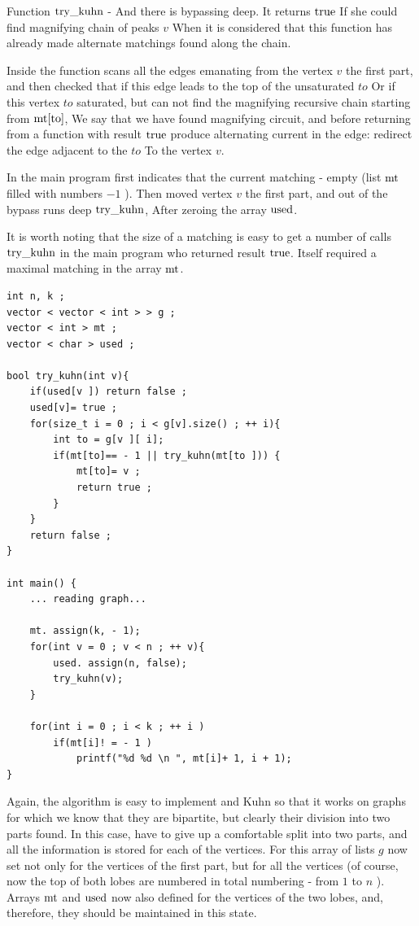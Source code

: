 Function $\rm try \_kuhn$ - And there is bypassing deep. It returns $\rm true$ If she could find magnifying chain of peaks $v$ When it is considered that this function has already made alternate matchings found along the chain.

Inside the function scans all the edges emanating from the vertex $v$ the first part, and then checked that if this edge leads to the top of the unsaturated $to$ Or if this vertex $to$ saturated, but can not find the magnifying recursive chain starting from $\rm mt [to]$, We say that we have found magnifying circuit, and before returning from a function with result $\rm true$ produce alternating current in the edge: redirect the edge adjacent to the $to$ To the vertex $v$.

In the main program first indicates that the current matching - empty (list $\rm mt$ filled with numbers $-1$ ). Then moved vertex $v$ the first part, and out of the bypass runs deep $\rm try \_kuhn$, After zeroing the array $\rm used$.

It is worth noting that the size of a matching is easy to get a number of calls $\rm try \_kuhn$ in the main program who returned result $\rm true$. Itself required a maximal matching in the array $\rm mt$.

\begin{verbatim}
int n, k ;
vector < vector < int > > g ;
vector < int > mt ;
vector < char > used ;
 
bool try_kuhn(int v){
    if(used[v ]) return false ;
    used[v]= true ;
    for(size_t i = 0 ; i < g[v].size() ; ++ i){
        int to = g[v ][ i];
        if(mt[to]== - 1 || try_kuhn(mt[to ])) {
            mt[to]= v ;
            return true ;
        }
    }
    return false ;
}
 
int main() {
    ... reading graph...
 
    mt. assign(k, - 1);
    for(int v = 0 ; v < n ; ++ v){
        used. assign(n, false);
        try_kuhn(v);
    }
 
    for(int i = 0 ; i < k ; ++ i )
        if(mt[i]! = - 1 )
            printf("%d %d \n ", mt[i]+ 1, i + 1);
} 
\end{verbatim}
Again, the algorithm is easy to implement and Kuhn so that it works on graphs for which we know that they are bipartite, but clearly their division into two parts found. In this case, have to give up a comfortable split into two parts, and all the information is stored for each of the vertices. For this array of lists $g$ now set not only for the vertices of the first part, but for all the vertices (of course, now the top of both lobes are numbered in total numbering - from $1$ to $n$ ). Arrays $\rm mt$ and $\rm used$ now also defined for the vertices of the two lobes, and, therefore, they should be maintained in this state.

